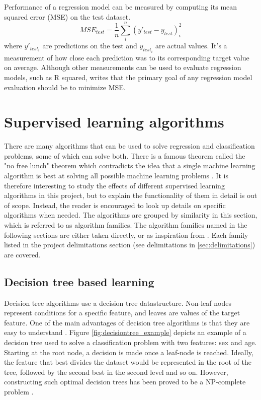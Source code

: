 	Performance of a regression model can be measured by computing its mean squared error (MSE) on the test dataset. 
\begin{equation}
	MSE_{test} = \frac{1}{n} \sum_{i}^{n}(y'_{test} - y_{test})_{i}^2
\end{equation}
where $y'_{test_i}$ are predictions on the test and $y_{test_i}$ are actual values. It's a measurement of how close each prediction was to its corresponding target value on average. Although other measurements can be used to evaluate regression models, such as R squared, \cite{BOOK:13} writes that the primary goal of any regression model evaluation should be to minimize MSE.

	
\section{Supervised learning algorithms} \label{sec:supervised_algorithms}
	There are many algorithms that can be used to solve regression and classification problems, some of which can solve both. There is a famous theorem called the "no free lunch" theorem which contradicts the idea that a single machine learning algorithm is best at solving all possible machine learning problems \cite{ARTICLE:5}.  It is therefore interesting to study the effects of different supervised learning algorithms in this project, but to explain the functionality of them in detail is out of scope. Instead, the reader is encouraged to look up details on specific algorithms when needed. The algorithms are grouped by similarity in this section, which is referred to as algorithm families. The algorithm families named in the following sections are either taken directly, or as inspiration from \cite{BOOK:6}. Each family listed in the project delimitations section (see delimitations in \ref{sec:delimitations}) are covered. 

	\subsection{Decision tree based learning} \label{sec:tree_learning}
		Decision tree algorithms use a decision tree datastructure. Non-leaf nodes represent conditions for a specific feature, and leaves are values of the target feature. One of the main advantages of decision tree algorithms is that they are easy to understand \cite{ARTICLE:7}. Figure \ref{fig:decisiontree_example} depicts an example of a decision tree used to solve a classification problem with two features: sex and age. Starting at the root node, a decision is made once a leaf-node is reached. Ideally, the feature that best divides the dataset would be represented in the root of the tree, followed by the second best in the second level and so on. However, constructing such optimal decision trees has been proved to be a NP-complete problem \cite{ARTICLE:11}. 

